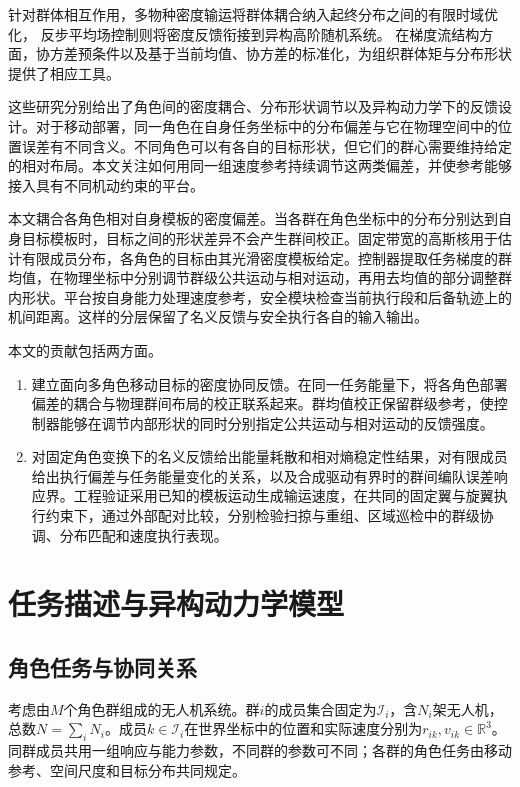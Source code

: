 \documentclass[UTF8,a4paper,11pt,fontset=none]{ctexart}
\newcommand{\R}{\mathbb R}\newcommand{\KL}{\operatorname{KL}}
\begin{document}
针对群体相互作用，多物种密度输运将群体耦合纳入起终分布之间的有限时域优化\cite{chen2024}，
反步平均场控制则将密度反馈衔接到异构高阶随机系统\cite{zheng2022backstep}。
在梯度流结构方面，协方差预条件以及基于当前均值、协方差的标准化，为组织群体矩与分布形状提供了相应工具\cite{garbuno2020,burger2025}。

这些研究分别给出了角色间的密度耦合、分布形状调节以及异构动力学下的反馈设计。对于移动部署，同一角色在自身任务坐标中的分布偏差与它在物理空间中的位置误差有不同含义。不同角色可以有各自的目标形状，但它们的群心需要维持给定的相对布局。本文关注如何用同一组速度参考持续调节这两类偏差，并使参考能够接入具有不同机动约束的平台。

本文耦合各角色相对自身模板的密度偏差。当各群在角色坐标中的分布分别达到自身目标模板时，目标之间的形状差异不会产生群间校正。固定带宽的高斯核用于估计有限成员分布，各角色的目标由其光滑密度模板给定。控制器提取任务梯度的群均值，在物理坐标中分别调节群级公共运动与相对运动，再用去均值的部分调整群内形状。平台按自身能力处理速度参考，安全模块检查当前执行段和后备轨迹上的机间距离。这样的分层保留了名义反馈与安全执行各自的输入输出\cite{wang2016hetero,chen2021backup}。

本文的贡献包括两方面。
\begin{enumerate}
\item 建立面向多角色移动目标的密度协同反馈。在同一任务能量下，将各角色部署偏差的耦合与物理群间布局的校正联系起来。群均值校正保留群级参考，使控制器能够在调节内部形状的同时分别指定公共运动与相对运动的反馈强度。
\item 对固定角色变换下的名义反馈给出能量耗散和相对熵稳定性结果，对有限成员给出执行偏差与任务能量变化的关系，以及合成驱动有界时的群间编队误差响应界。工程验证采用已知的模板运动生成输运速度，在共同的固定翼与旋翼执行约束下，通过外部配对比较，分别检验扫掠与重组、区域巡检中的群级协调、分布匹配和速度执行表现。
\end{enumerate}

\section{任务描述与异构动力学模型}
\subsection{角色任务与协同关系}
考虑由$M$个角色群组成的无人机系统。群$i$的成员集合固定为$\mathcal I_i$，含$N_i$架无人机，
总数$N=\sum_iN_i$。成员$k\in\mathcal I_i$在世界坐标中的位置和实际速度分别为$r_{ik},v_{ik}\in\R^3$。
同群成员共用一组响应与能力参数，不同群的参数可不同；各群的角色任务由移动参考、空间尺度和目标分布共同规定。
\end{document}
